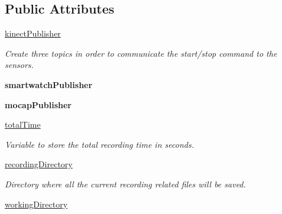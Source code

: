 \subsection*{Public Attributes}
\begin{DoxyCompactItemize}
\item 
\hyperlink{classGUI__node_1_1MainWindow_ab26e179eff19c4b964aa6bd36c91d595}{kinect\+Publisher}\hypertarget{classGUI__node_1_1MainWindow_ab26e179eff19c4b964aa6bd36c91d595}{}\label{classGUI__node_1_1MainWindow_ab26e179eff19c4b964aa6bd36c91d595}

\begin{DoxyCompactList}\small\item\em Create three topics in order to communicate the start/stop command to the sensors. \end{DoxyCompactList}\item 
{\bfseries smartwatch\+Publisher}\hypertarget{classGUI__node_1_1MainWindow_ac7aedba16d83e28a2952abc28968885e}{}\label{classGUI__node_1_1MainWindow_ac7aedba16d83e28a2952abc28968885e}

\item 
{\bfseries mocap\+Publisher}\hypertarget{classGUI__node_1_1MainWindow_ab359c61dae9dae4a812103ecf23d0e2c}{}\label{classGUI__node_1_1MainWindow_ab359c61dae9dae4a812103ecf23d0e2c}

\item 
\hyperlink{classGUI__node_1_1MainWindow_a02198b72f9182a5c79ee3834edf95108}{total\+Time}
\begin{DoxyCompactList}\small\item\em Variable to store the total recording time in seconds. \end{DoxyCompactList}\item 
\hyperlink{classGUI__node_1_1MainWindow_ad8b02713e5b5516ef657c7097cf54ca4}{recording\+Directory}\hypertarget{classGUI__node_1_1MainWindow_ad8b02713e5b5516ef657c7097cf54ca4}{}\label{classGUI__node_1_1MainWindow_ad8b02713e5b5516ef657c7097cf54ca4}

\begin{DoxyCompactList}\small\item\em Directory where all the current recording related files will be saved. \end{DoxyCompactList}\item 
\hyperlink{classGUI__node_1_1MainWindow_a45f694f080c9291370d9d58a5192c158}{working\+Directory}\hypertarget{classGUI__node_1_1MainWindow_a45f694f080c9291370d9d58a5192c158}{}\label{classGUI__node_1_1MainWindow_a45f694f080c9291370d9d58a5192c158}


\end{DoxyCompactItemize}
